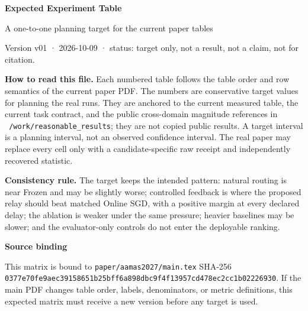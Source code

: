 \documentclass[10pt]{article}
\newcommand{\smallnote}[1]{{\footnotesize\color{Gray}#1}}
\begin{document}
{\color{Blue}\Large\bfseries Expected Experiment Table}\par
{\color{Ink}\large A one-to-one planning target for the current paper tables}\par
\smallnote{Version v01 · 2026-10-09 · status: target only, not a result, not a claim, not for citation.}

\begin{minipage}{\linewidth}
\small
\textbf{How to read this file.} Each numbered table follows the table order and row semantics of the current paper PDF. The numbers are conservative target values for planning the real runs. They are anchored to the current measured table, the current task contract, and the public cross-domain magnitude references in \texttt{~/work/reasonable\_results}; they are not copied public results. A target interval is a planning interval, not an observed confidence interval. The real paper may replace every cell only with a candidate-specific raw receipt and independently recovered statistic.

\textbf{Consistency rule.} The target keeps the intended pattern: natural routing is near Frozen and may be slightly worse; controlled feedback is where the proposed relay should beat matched Online SGD, with a positive margin at every declared delay; the ablation is weaker under the same pressure; heavier baselines may be slower; and the evaluator-only controls do not enter the deployable ranking.
\end{minipage}

\vspace{4pt}
{\color{Ink}\bfseries Source binding}\par
\small
This matrix is bound to \texttt{paper/aamas2027/main.tex} SHA-256
\texttt{0377e70fe9aec39158651b25bff6a898dbc9f4f13957cd478ec2cc1b02226930}.
If the main PDF changes table order, labels, denominators, or metric definitions, this expected matrix must receive a new version before any target is used.
\end{document}
